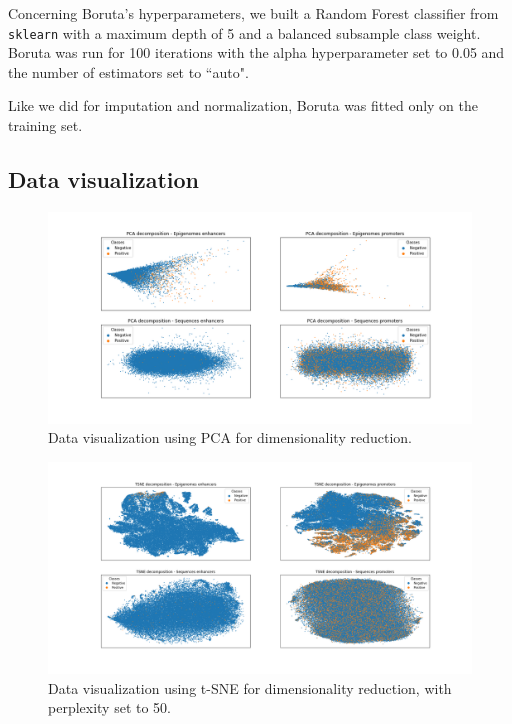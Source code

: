 \documentclass{article}
\begin{document}
Concerning Boruta's hyperparameters, we built a Random Forest classifier from \texttt{sklearn} with a maximum depth of 5 and a balanced subsample class weight. Boruta was run for 100 iterations with the alpha hyperparameter set to 0.05 and the number of estimators set to  “auto".

Like we did for imputation and normalization, Boruta was fitted only on the training set.

\subsection{Data visualization}
\label{subsec:exp:visualization}

\begin{figure}
    \centering
    \includegraphics[width=\textwidth]{img/pca.png}
    \caption{Data visualization using PCA for dimensionality reduction.}
    \label{fig:exp:data_viz_pca}
\end{figure}

\begin{figure}
    \centering
    \includegraphics[width=\textwidth]{img/50_tsne.png}
    \caption{Data visualization using t-SNE for dimensionality reduction, with perplexity set to 50.}
    \label{fig:exp:data_viz_tsne}
\end{figure}
\end{document}
